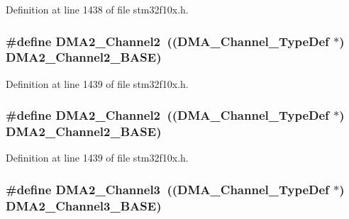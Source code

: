 Definition at line 1438 of file stm32f10x.\+h.

\subsubsection[{\texorpdfstring{D\+M\+A2\+\_\+\+Channel2}{DMA2_Channel2}}]{\setlength{\rightskip}{0pt plus 5cm}\#define D\+M\+A2\+\_\+\+Channel2~(({\bf D\+M\+A\+\_\+\+Channel\+\_\+\+Type\+Def} $\ast$) {\bf D\+M\+A2\+\_\+\+Channel2\+\_\+\+B\+A\+SE})}\hypertarget{group___peripheral__declaration_ga316024020799373b9d8e35c316c74f24}{}\label{group___peripheral__declaration_ga316024020799373b9d8e35c316c74f24}


Definition at line 1439 of file stm32f10x.\+h.

\subsubsection[{\texorpdfstring{D\+M\+A2\+\_\+\+Channel2}{DMA2_Channel2}}]{\setlength{\rightskip}{0pt plus 5cm}\#define D\+M\+A2\+\_\+\+Channel2~(({\bf D\+M\+A\+\_\+\+Channel\+\_\+\+Type\+Def} $\ast$) {\bf D\+M\+A2\+\_\+\+Channel2\+\_\+\+B\+A\+SE})}\hypertarget{group___peripheral__declaration_ga316024020799373b9d8e35c316c74f24}{}\label{group___peripheral__declaration_ga316024020799373b9d8e35c316c74f24}


Definition at line 1439 of file stm32f10x.\+h.

\subsubsection[{\texorpdfstring{D\+M\+A2\+\_\+\+Channel3}{DMA2_Channel3}}]{\setlength{\rightskip}{0pt plus 5cm}\#define D\+M\+A2\+\_\+\+Channel3~(({\bf D\+M\+A\+\_\+\+Channel\+\_\+\+Type\+Def} $\ast$) {\bf D\+M\+A2\+\_\+\+Channel3\+\_\+\+B\+A\+SE})}\hypertarget{group___peripheral__declaration_ga6dca52a79587e0ca9a5d669048b4c7eb}{}\label{group___peripheral__declaration_ga6dca52a79587e0ca9a5d669048b4c7eb}


